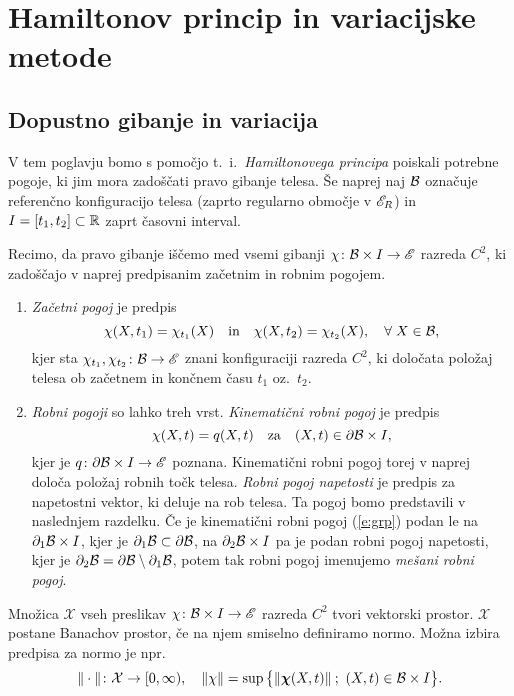 \chapter{Hamiltonov princip in variacijske metode} \label{pog:ham}


\section{Dopustno gibanje in variacija}


V tem poglavju bomo s pomočjo t.~i.~\emph{Hamiltonovega principa} poiskali potrebne pogoje,
ki jim mora zadoščati pravo gibanje telesa. Še naprej naj $\mathcal B$ označuje referenčno konfiguracijo
telesa (zaprto regularno območje v $\mathscr E_R$) in $I=[t_1,t_2]\subset\mathbb R$ zaprt časovni interval.

Recimo, da pravo gibanje iščemo med vsemi gibanji
$\chi\colon \mathcal B\times I\to\mathscr E$ razreda $C^2$, ki zadoščajo v naprej predpisanim začetnim
in robnim pogojem.
\begin{enumerate}
	\item \emph{Začetni pogoj} je predpis
		\begin{equation} \label{e:zacetnipogoj}
			\chi(X,t_1)=\chi_{t_1}(X)\quad\textrm{in}\quad \chi(X,t_2)=\chi_{t_2}(X),\quad\forall\;X\in\mathcal B,
		\end{equation}
		kjer sta $\chi_{t_1},\chi_{t_2}\colon \mathcal B\to\mathscr E$ znani konfiguraciji razreda $C^2$, ki
		določata položaj telesa ob začetnem in končnem času $t_1$ oz.~$t_2$.
	\item \emph{Robni pogoji} so lahko treh vrst. \emph{Kinematični robni pogoj} je predpis
		\begin{equation} \label{e:grp}
			\chi(X,t)=q(X,t)\quad\mathrm{za}\quad (X,t)\in \partial\mathcal B\times I,
		\end{equation}
		kjer je $q\colon\partial\mathcal B\times I\to\mathscr E$ poznana.
		Kinematični robni pogoj torej v naprej določa položaj robnih točk telesa.
		\emph{Robni pogoj napetosti} je predpis za napetostni vektor, ki deluje na rob telesa.
		Ta pogoj bomo predstavili v naslednjem razdelku. Če je kinematični robni pogoj (\ref{e:grp})
		podan le na $\partial_1\mathcal B\times I$, kjer je $\partial_1\mathcal B\subset\partial\mathcal B$, na
		$\partial_2\mathcal B\times I$ pa je podan robni pogoj napetosti, kjer je $\partial_2\mathcal B=\partial\mathcal B\setminus\partial_1\mathcal B$,
		potem tak robni pogoj imenujemo \emph{mešani robni pogoj}.
\end{enumerate}

Množica $\mathcal{X}$ vseh preslikav $\chi\colon \mathcal B\times I\to\mathscr E$
razreda $C^2$ tvori vektorski prostor.
$\mathcal{X}$ postane Banachov prostor, če na njem smiselno definiramo normo. Možna izbira
predpisa za normo je npr.
\[
	\|\cdot\|\colon\mathcal{X}\to[0,\infty),\quad
	\|\chi\|=\sup\big\{\|\boldsymbol \chi(X,t)\|\: ;\ (X,t)\in \mathcal B\times I\big\}.
\]

